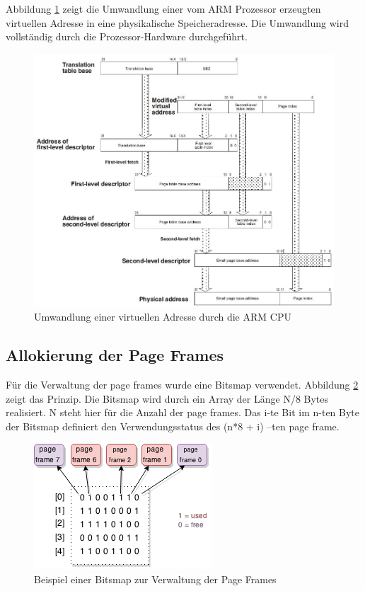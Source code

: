 Abbildung \ref{fig:largePageTranslation} zeigt die Umwandlung einer vom ARM Prozessor erzeugten virtuellen Adresse in eine physikalische Speicheradresse. Die Umwandlung wird vollständig durch die Prozessor-Hardware durchgeführt.

\begin{figure}[H]
	\includegraphics[scale=0.8]{figures/largePageTranslation}
	\caption{Umwandlung einer virtuellen Adresse durch die ARM CPU \cite[S. B3-1337]{ARM:ARM}}
	\label{fig:largePageTranslation}
\end{figure}



\subsection{Allokierung der Page Frames}

Für die Verwaltung der page frames wurde eine Bitsmap verwendet. Abbildung \ref{fig:BitsMap} zeigt das Prinzip.
Die Bitsmap wird durch ein Array der Länge N/8 Bytes realisiert. N steht hier für die Anzahl der page frames. Das i-te Bit im n-ten Byte der Bitsmap definiert den Verwendungsstatus des (n*8 + i) –ten page frame.


\begin{figure}[H]
	\centering
	\includegraphics[scale=1]{figures/BitsMap}
	\caption{Beispiel einer Bitsmap zur Verwaltung der Page Frames}
	\label{fig:BitsMap}
\end{figure}

\pagebreak 